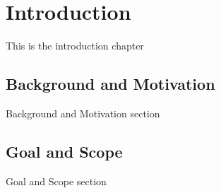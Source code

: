 \chapter{Introduction}

This is the introduction chapter 

\section{Background and Motivation}
Background and Motivation section

\section{Goal and Scope}
Goal and Scope section